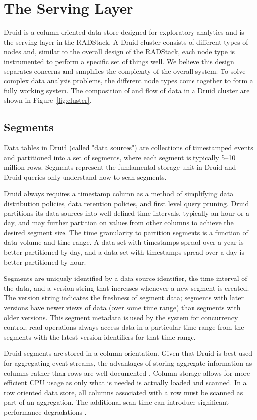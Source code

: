 \documentclass{vldb}
\begin{document}
\section{The Serving Layer}
\label{sec:serving}
Druid is a column-oriented data store designed for exploratory analytics and is
the serving layer in the RADStack. A Druid cluster consists of different types
of nodes and, similar to the overall design of the RADStack, each node type is
instrumented to perform a specific set of things well. We believe this design
separates concerns and simplifies the complexity of the overall system. To
solve complex data analysis problems, the different node types come together to
form a fully working system. The composition of and flow of data in a Druid
cluster are shown in Figure~\ref{fig:cluster}.

\subsection{Segments}
\label{sec:segments}
Data tables in Druid (called "data sources") are collections of timestamped
events and partitioned into a set of segments, where each segment is typically
5–10 million rows. Segments represent the fundamental storage unit in
Druid and Druid queries only understand how to scan segments. 

Druid always requires a timestamp column as a method of simplifying data
distribution policies, data retention policies, and first level query pruning.
Druid partitions its data sources into well defined time intervals, typically
an hour or a day, and may further partition on values from other columns to
achieve the desired segment size. The time granularity to partition segments is
a function of data volume and time range. A data set with timestamps spread
over a year is better partitioned by day, and a data set with timestamps spread
over a day is better partitioned by hour. 

Segments are uniquely identified by a data source identifier, the time interval
of the data, and a version string that increases whenever a new segment is
created. The version string indicates the freshness of segment data; segments
with later versions have newer views of data (over some time range) than
segments with older versions. This segment metadata is used by the system for
concurrency control; read operations always access data in a particular time
range from the segments with the latest version identifiers for that time
range.

Druid segments are stored in a column orientation. Given that Druid is best
used for aggregating event streams, the advantages of storing aggregate
information as columns rather than rows are well documented
\cite{abadi2008column}. Column storage allows for more efficient CPU usage as
only what is needed is actually loaded and scanned.  In a row oriented data
store, all columns associated with a row must be scanned as part of an
aggregation. The additional scan time can introduce significant performance
degradations \cite{abadi2008column}.
\end{document}
